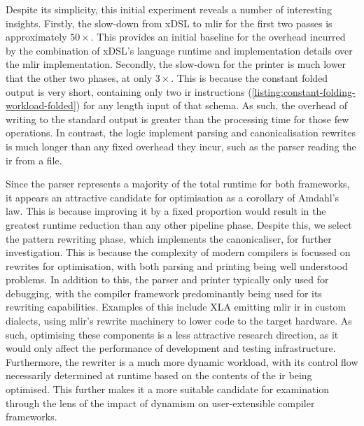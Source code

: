 Despite its simplicity, this initial experiment reveals a number of interesting insights.
Firstly, the slow-down from xDSL to \ac{mlir} for the first two passes is approximately $50\times$. This provides an initial baseline for the overhead incurred by the combination of xDSL's language runtime and implementation details over the \ac{mlir} implementation.
Secondly, the slow-down for the printer is much lower that the other two phases, at only $3\times$.
This is because the constant folded output is very short, containing only two \ac{ir} instructions (\autoref{listing:constant-folding-workload-folded}) for any length input of that schema. As such, the overhead of writing to the standard output is greater than the processing time for those few operations. In contrast, the logic implement parsing and canonicalisation rewrites is much longer than any fixed overhead they incur, such as the parser reading the \ac{ir} from a file.

Since the parser represents a majority of the total runtime for both frameworks, it appears an attractive candidate for optimisation as a corollary of Amdahl's law. This is because improving it by a fixed proportion would result in the greatest runtime reduction than any other pipeline phase.
Despite this, we select the pattern rewriting phase, which implements the canonicaliser, for further investigation.
This is because the complexity of modern compilers is focussed on rewrites for optimisation, with both parsing and printing being well understood problems. In addition to this, the parser and printer typically only used for debugging, with the compiler framework predominantly being used for its rewriting capabilities. Examples of this include XLA \cite{sabne2020xla} emitting \ac{mlir} \ac{ir} in custom dialects, using \ac{mlir}'s rewrite machinery to lower code to the target hardware.
As such, optimising these components is a less attractive research direction, as it would only affect the performance of development and testing infrastructure.
Furthermore, the rewriter is a much more dynamic workload, with its control flow necessarily determined at runtime based on the contents of the \ac{ir} being optimised.
This further makes it a more suitable candidate for examination through the lens of the impact of dynamism on user-extensible compiler frameworks.



